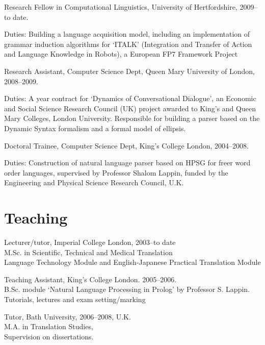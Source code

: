 \documentclass[a4paper]{article}
\renewenvironment{itemize}{
  \begin{list}{}{
    \setlength{\leftmargin}{1.5em}
  }
}{
  \end{list}
}
\begin{document}
\begin{itemize}
\item \hspace{-.2cm}Research Fellow in Computational Linguistics,
  University of Hertfordshire, 2009--to date. 

\hspace{-.2cm}Duties: Building a language acquisition model, including an implementation of grammar induction algorithms for `ITALK' (Integration and Transfer of Action and Language Knowledge in Robots), a European FP7 Framework Project  \\

\item \hspace{-.2cm}Research Assistant, Computer Science Dept, Queen
  Mary University of London, 2008--2009.

\hspace{-.2cm}Duties: A year contract for `Dynamics of Conversational
Dialogue', an Economic and Social Science Research Council (UK)
project awarded to King's and Queen Mary Colleges, London University. Responsible for building a parser based on the Dynamic Syntax formalism and a formal model of ellipsis.

\item \hspace{-.2cm}Doctoral Trainee, Computer Science Dept, King's
  College London, 2004--2008.

\hspace{-.2cm}Duties: Construction of natural language parser based on
HPSG for freer word order languages, supervised by Professor Shalom
Lappin, funded by the Engineering and Physical Science Research Council, U.K. 
\end{itemize}



\section*{Teaching}
\begin{itemize}

\item Lecturer/tutor, Imperial College London,  2003--to date\\
   M.Sc. in Scientific, Technical and Medical Translation \\
   Language Technology Module and English-Japanese Practical Translation Module

\item Teaching Assistant, King's College London. 2005--2006.\\
    B.Sc. module `Natural Language Processing in Prolog' by Professor S. Lappin.\\
   Tutorials, lectures and exam setting/marking



\item Tutor, Bath University, 2006--2008, U.K.\\
   M.A. in Translation Studies, \\Supervision on dissertations.


\end{itemize}
\end{document}
